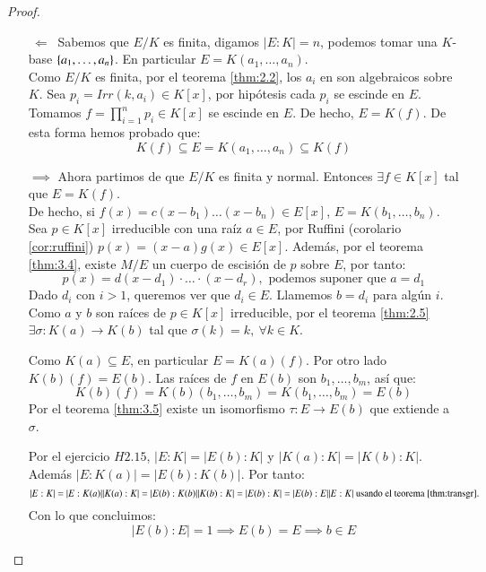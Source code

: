 \begin{proof}$ $
    \begin{itemize}
        \item[$\ \Longleftarrow\ $] Sabemos que $E/K$ es finita, digamos $|E:K| = n$, podemos tomar una $K$-base $\left\{a_1, \ldots, a_n\right\}$. En particular $E=K(a_1, \ldots, a_n)$.\\
        Como $E/K$ es finita, por el teorema \ref{thm:2.2}, los $a_i$ en son algebraicos sobre $K$. Sea $p_i = Irr(k, a_i) \in K[x]$, por hipótesis cada $p_i$ se escinde en $E$.\\

        Tomamos $f = \prod_{i=1}^{n} p_i \in K[x]$ se escinde en $E$. De hecho, $E = K(f)$. De esta forma hemos probado que:
        $$
            K(f) \subseteq E = K(a_1, \ldots, a_n) \subseteq K(f)
        $$
        \item[$\implies$] Ahora partimos de que $E/K$ es finita y normal. Entonces $\exists f \in K[x]$ tal que $E = K(f)$.\\
        De hecho, si $f(x) = c(x - b_1) \ldots (x-b_n) \in E[x]$, $E = K(b_1, \ldots, b_n)$.\\
        Sea $p\in K[x]$ irreducible con una raíz $a\in E$, por Ruffini (corolario \ref{cor:ruffini}) $p(x) = (x-a)g(x)\in E[x]$. Además, por el teorema \ref{thm:3.4}, existe $M/E$ un cuerpo de escisión de $p$ sobre $E$, por tanto:
        $$
            p(x) = d(x-d_1) \cdot \ldots \cdot (x-d_r), \text{ podemos suponer que $a = d_1$}
        $$
        Dado $d_i$ con $i > 1$, queremos ver que $d_i \in E$. Llamemos $b = d_i$ para algún $i$. Como $a$ y $b$ son raíces de $p \in K[x]$ irreducible, por el teorema \ref{thm:2.5} $\exists \sigma: K(a) \to K(b)$ tal que $\sigma(k) = k,\ \forall k \in K$.


        Como $K(a) \subseteq E$, en particular $E = K(a)(f)$. Por otro lado $K(b)(f) = E(b)$. Las raíces de $f$ en $E(b)$ son $b_1, \ldots, b_m$, así que:
        $$
            K(b)(f) = K(b)(b_1, \ldots, b_m) = K(b_1, \ldots, b_m) = E(b)
        $$
        Por el teorema \ref{thm:3.5} existe un isomorfismo $\tau: E \to E(b)$ que extiende a $\sigma$.

        Por el ejercicio $H2.15$, $|E:K| = |E(b):K|$ y $|K(a):K| = |K(b):K|$. Además $|E:K(a)| = |E(b):K(b)|$.
        Por tanto:
        $$
            |E:K| = |E:K(a)||K(a):K| = |E(b):K(b)||K(b):K| = |E(b):K| = |E(b):E||E:K| \text{ usando el teorema \ref{thm:transgr}.}
        $$
        Con lo que concluimos:
        $$
            |E(b):E| = 1 \implies E(b) = E \implies b\in E
        $$
    \end{itemize}
\end{proof}


